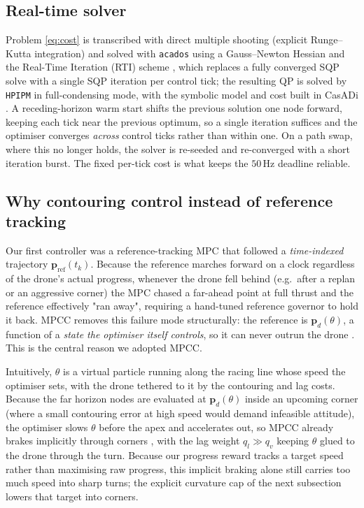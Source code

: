 \documentclass[conference]{IEEEtran}
\begin{document}
\subsection{Real-time solver}
Problem \eqref{eq:cost} is transcribed with direct multiple shooting
(explicit Runge--Kutta integration) and solved with \texttt{acados}
\cite{verschueren2022acados} using a Gauss--Newton Hessian and the Real-Time
Iteration (RTI) scheme \cite{diehl2005rti}, which replaces a fully converged SQP
solve with a single SQP iteration per control tick; the resulting QP is solved by
\texttt{HPIPM} \cite{frison2020hpipm} in full-condensing mode, with the symbolic
model and cost built in CasADi \cite{andersson2019casadi}. A receding-horizon warm start shifts the previous
solution one node forward, keeping each tick near the previous optimum, so a single
iteration suffices and the optimiser converges \emph{across} control ticks rather
than within one. On a path swap, where this no longer holds, the solver is re-seeded
and re-converged with a short iteration burst. The fixed per-tick cost is what keeps
the $50\,\mathrm{Hz}$ deadline reliable.



\subsection{Why contouring control instead of reference tracking}
Our first controller was a reference-tracking MPC that followed a
\emph{time-indexed} trajectory $\mathbf{p}_{\mathrm{ref}}(t_k)$. Because the
reference marches forward on a clock regardless of the drone's actual progress,
whenever the drone fell behind (e.g.\ after a replan or an aggressive corner) the
MPC chased a far-ahead point at full thrust and the reference effectively "ran
away", requiring a hand-tuned reference governor to hold it back. MPCC removes
this failure mode structurally: the reference is $\mathbf{p}_d(\theta)$, a
function of a \emph{state the optimiser itself controls}, so it can never outrun
the drone \cite{romero2022mpcc}. This is the central reason we adopted MPCC.

Intuitively, $\theta$ is a virtual particle running along the racing line whose
speed the optimiser sets, with the drone tethered to it by the contouring and lag
costs. Because the far horizon nodes are evaluated at $\mathbf{p}_d(\theta)$ inside
an upcoming corner (where a small contouring error at high speed would demand
infeasible attitude), the optimiser slows $\theta$ before the apex and
accelerates out, so MPCC already brakes implicitly through corners
\cite{romero2022mpcc,krinner2024mpccpp}, with the lag weight $q_l\!\gg\!q_v$
keeping $\theta$ glued to the drone through the turn. Because our progress reward
tracks a target speed rather than maximising raw progress, this implicit braking
alone still carries too much speed into sharp turns; the explicit curvature cap of
the next subsection lowers that target into corners.
\end{document}
